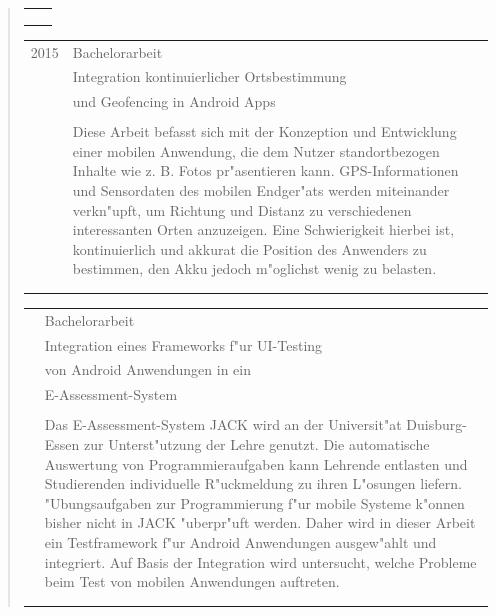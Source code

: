 \begin{quote}
\begin{tabular}{p{4cm}l}
\begin{minipage}{10cm}
		\end{minipage}\\\\\\
	\end{tabular}
 	\begin{tabular}{p{4cm}l}
 		2015&Bachelorarbeit\\
 		&\qquad Integration kontinuierlicher Ortsbestimmung\\
 		&\qquad und Geofencing in Android Apps\\\\
 		&\begin{minipage}{10cm}
 		Diese Arbeit befasst sich mit der Konzeption und Entwicklung einer mobilen Anwendung, die dem Nutzer standortbezogen Inhalte wie z. B. Fotos pr"asentieren kann. GPS-Informationen und Sensordaten des mobilen Endger"ats werden miteinander verkn"upft, um Richtung und Distanz zu verschiedenen interessanten Orten anzuzeigen. Eine Schwierigkeit hierbei ist, kontinuierlich und akkurat die Position des Anwenders zu bestimmen, den Akku jedoch m"oglichst wenig zu belasten.
		\end{minipage}\\\\\\
	\end{tabular}
 	\begin{tabular}{p{4cm}l}
 		&Bachelorarbeit\\
 		&\qquad Integration eines Frameworks f"ur UI-Testing\\
 		&\qquad von Android Anwendungen in ein \\
 		&\qquad  E-Assessment-System\\\\
 		&\begin{minipage}{10cm}
 		Das E-Assessment-System JACK wird an der Universit"at Duisburg-Essen zur Unterst"utzung der Lehre genutzt. Die automatische Auswertung von Programmieraufgaben kann Lehrende entlasten und Studierenden individuelle R"uckmeldung zu ihren L"osungen liefern. "Ubungsaufgaben zur Programmierung f"ur mobile Systeme k"onnen bisher nicht in JACK "uberpr"uft werden. Daher wird in dieser Arbeit ein Testframework f"ur Android Anwendungen ausgew"ahlt und integriert. Auf Basis der Integration wird untersucht, welche Probleme beim Test von mobilen Anwendungen auftreten.
		\end{minipage}\\\\\\

\end{tabular}
\end{quote}
